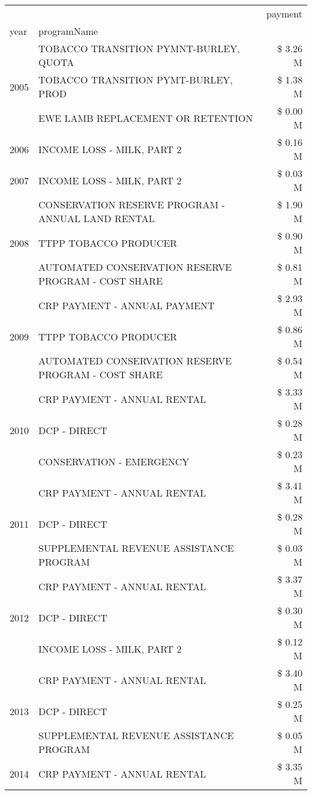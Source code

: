 \begin{tabular}{llr}
\toprule
 &  & payment \\
year & programName &  \\
\midrule
\multirow[t]{3}{*}{2005} & TOBACCO TRANSITION PYMNT-BURLEY, QUOTA & \$ 3.26 M \\
 & TOBACCO TRANSITION PYMT-BURLEY, PROD & \$ 1.38 M \\
 & EWE LAMB REPLACEMENT OR RETENTION & \$ 0.00 M \\
\cline{1-3}
2006 & INCOME LOSS - MILK, PART 2 & \$ 0.16 M \\
\cline{1-3}
2007 & INCOME LOSS - MILK, PART 2 & \$ 0.03 M \\
\cline{1-3}
\multirow[t]{3}{*}{2008} & CONSERVATION RESERVE PROGRAM - ANNUAL LAND RENTAL & \$ 1.90 M \\
 & TTPP TOBACCO PRODUCER & \$ 0.90 M \\
 & AUTOMATED CONSERVATION RESERVE PROGRAM - COST SHARE & \$ 0.81 M \\
\cline{1-3}
\multirow[t]{3}{*}{2009} & CRP PAYMENT - ANNUAL PAYMENT & \$ 2.93 M \\
 & TTPP TOBACCO PRODUCER & \$ 0.86 M \\
 & AUTOMATED CONSERVATION RESERVE PROGRAM - COST SHARE & \$ 0.54 M \\
\cline{1-3}
\multirow[t]{3}{*}{2010} & CRP PAYMENT - ANNUAL RENTAL & \$ 3.33 M \\
 & DCP - DIRECT & \$ 0.28 M \\
 & CONSERVATION - EMERGENCY & \$ 0.23 M \\
\cline{1-3}
\multirow[t]{3}{*}{2011} & CRP PAYMENT - ANNUAL RENTAL & \$ 3.41 M \\
 & DCP - DIRECT & \$ 0.28 M \\
 & SUPPLEMENTAL REVENUE ASSISTANCE PROGRAM & \$ 0.03 M \\
\cline{1-3}
\multirow[t]{3}{*}{2012} & CRP PAYMENT - ANNUAL RENTAL & \$ 3.37 M \\
 & DCP - DIRECT & \$ 0.30 M \\
 & INCOME LOSS - MILK, PART 2 & \$ 0.12 M \\
\cline{1-3}
\multirow[t]{3}{*}{2013} & CRP PAYMENT - ANNUAL RENTAL & \$ 3.40 M \\
 & DCP - DIRECT & \$ 0.25 M \\
 & SUPPLEMENTAL REVENUE ASSISTANCE PROGRAM & \$ 0.05 M \\
\cline{1-3}
\multirow[t]{3}{*}{2014} & CRP PAYMENT - ANNUAL RENTAL & \$ 3.35 M \\

\end{tabular}
